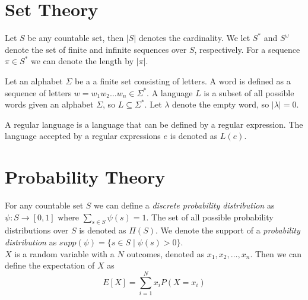 \section*{Set Theory}
Let $S$ be any countable set, then $|S|$ denotes the cardinality. We let $S^*$ and $S^\omega$ denote the set of finite and infinite sequences over $S$, respectively. For a sequence $\pi\in S^*$ we can denote the length by $|\pi|$.

Let an alphabet $\Sigma$ be a a finite set consisting of letters. A word is defined as a sequence of letters $w=w_1 w_2\dots w_n\in \Sigma^*$. A language $L$ is a subset of all possible words given an alphabet $\Sigma$, so $L\subseteq \Sigma^*$. Let $\lambda$ denote the empty word, so $|\lambda|=0$.

A regular language is a language that can be defined by a regular expression. The language accepted by a regular expressions $e$ is denoted as $L(e)$.



\section*{Probability Theory}
For any countable set $S$ we can define a \textit{discrete probability distribution} as $\psi: S\to[0,1]$ where $\sum\limits_{s\in S} \psi(s)=1$. The set of all possible probability distributions over $S$ is denoted as $\Pi(S)$. We denote the support of a \textit{probability distribution} as $supp(\psi)=\{s\in S\mid \psi(s)>0\}$.\\

$X$ is a random variable with a $N$ outcomes, denoted as $x_1, x_2,\dots, x_n$. Then we can define the expectation of $X$ as 
\[E[X] = \sum\limits_{i=1}^{N} x_i P(X=x_i)\]

	


